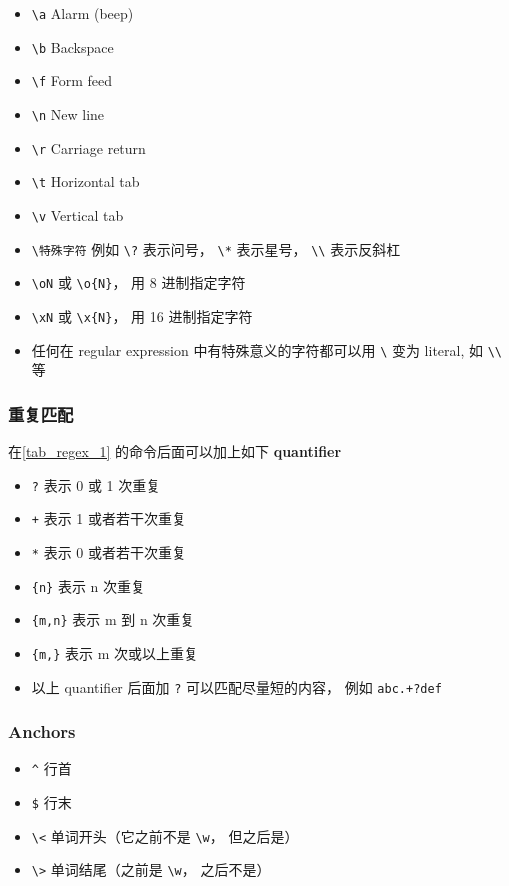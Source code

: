 \begin{itemize}
\item \verb`\a` Alarm (beep)
\item \verb`\b` Backspace
\item \verb`\f` Form feed
\item \verb`\n` New line
\item \verb`\r` Carriage return
\item \verb`\t` Horizontal tab
\item \verb`\v` Vertical tab
\item \verb`\特殊字符` 例如 \verb`\?` 表示问号， \verb`\*` 表示星号， \verb`\\` 表示反斜杠
\item \verb`\oN` 或 \verb`\o{N}`， 用 8 进制指定字符
\item \verb`\xN` 或 \verb`\x{N}`， 用 16 进制指定字符
\item 任何在 regular expression 中有特殊意义的字符都可以用 \verb`\` 变为 literal, 如 \verb`\\` 等
\end{itemize}

\subsubsection{重复匹配}
在\autoref{tab_regex_1} 的命令后面可以加上如下 \textbf{quantifier}
\begin{itemize}
\item \verb`?` 表示 0 或 1 次重复
\item \verb`+` 表示 1 或者若干次重复
\item \verb`*` 表示 0 或者若干次重复
\item \verb`{n}` 表示 n 次重复
\item \verb`{m,n}` 表示 m 到 n 次重复
\item \verb`{m,}` 表示 m 次或以上重复
\item 以上 quantifier 后面加 \verb`?` 可以匹配尽量短的内容， 例如 \verb`abc.+?def`
\end{itemize}

\subsubsection{Anchors}
\begin{itemize}
\item \verb`^` 行首
\item \verb`$` 行末
\item \verb`\<` 单词开头（它之前不是 \verb`\w`， 但之后是）
\item \verb`\>` 单词结尾（之前是 \verb`\w`， 之后不是）
\end{itemize}


